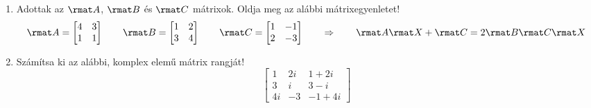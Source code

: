 \documentclass[a4paper, 12pt]{scrartcl}
\begin{document}
\begin{enumerate}
  \item Adottak az $\rmat A$, $\rmat B$ és $\rmat C$ mátrixok. Oldja meg az
        alábbi mátrixegyenletet!
        $$
          \rmat A = \begin{bmatrix}
            4 & 3 \\
            1 & 1
          \end{bmatrix}
          \qquad
          \rmat B = \begin{bmatrix}
            1 & 2 \\
            3 & 4
          \end{bmatrix}
          \qquad
          \rmat C = \begin{bmatrix}
            1 & -1 \\
            2 & -3
          \end{bmatrix}
          \qquad \Rightarrow \qquad
          \rmat A \rmat X + \rmat C = 2\rmat B \rmat C \rmat X
        $$

  \item Számítsa ki az alábbi, komplex elemű mátrix rangját!
        $$
          \begin{bmatrix}
            1  & 2i & 1+2i    \\
            3  & i  & 3-i     \\
            4i & -3 & -1 + 4i
          \end{bmatrix}
        $$
\end{enumerate}
\end{document}
